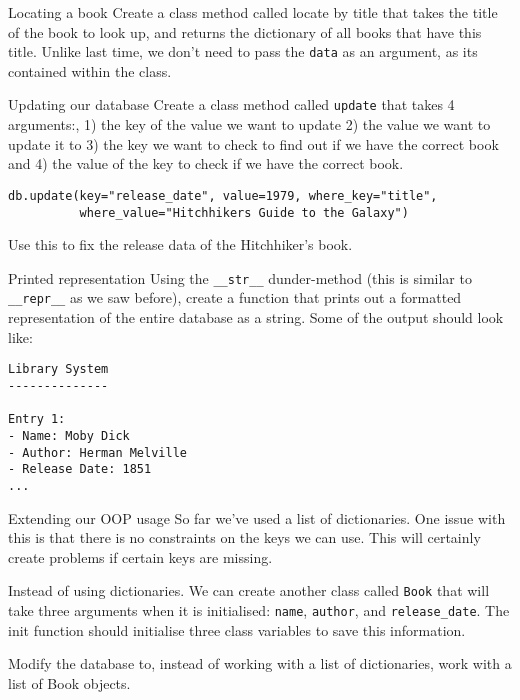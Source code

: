 \documentclass[10pt]{beamer}
\begin{document}
\begin{frame}[label={sec:org8b08d03},fragile]{Locating a book}
 Create a class method called locate by title that takes the title of the book to look
up, and returns the dictionary of all books that have this title. Unlike last time,
we don't need to pass the \texttt{data} as an argument, as its contained within the class.
\end{frame}

\begin{frame}[label={sec:orge1ae884},fragile]{Updating our database}
 Create a class method called \texttt{update} that takes 4 arguments:, 1) the key of the value
we want to update 2) the value we want to update it to 3) the key we want to check
to find out if we have the correct book and 4) the value of the key to check if we
have the correct book.

\begin{verbatim}
db.update(key="release_date", value=1979, where_key="title",
          where_value="Hitchhikers Guide to the Galaxy")
\end{verbatim}

Use this to fix the release data of the Hitchhiker's book.
\end{frame}

\begin{frame}[label={sec:orgd1926af},fragile]{Printed representation}
 Using the \texttt{\_\_str\_\_} dunder-method (this is similar to \texttt{\_\_repr\_\_} as we saw before),
create a function that prints out a formatted representation of the entire database
as a string. Some of the output should look like:

\begin{verbatim}
Library System
--------------

Entry 1:
- Name: Moby Dick
- Author: Herman Melville
- Release Date: 1851
...
\end{verbatim}
\end{frame}

\begin{frame}[label={sec:org0cebc26},fragile]{Extending our OOP usage}
 So far we've used a list of dictionaries. One issue with this is that there is no
constraints on the keys we can use. This will certainly create problems if certain
keys are missing.

Instead of using dictionaries. We can create another class called \texttt{Book} that will take
three arguments when it is initialised: \texttt{name}, \texttt{author}, and \texttt{release\_date}. The init
function should initialise three class variables to save this information.

Modify the database to, instead of working with a list of dictionaries, work with a
list of Book objects.
\end{frame}
\end{document}

